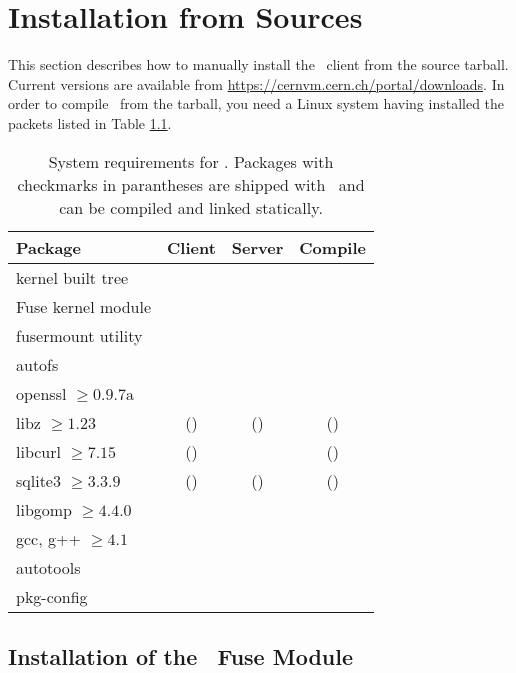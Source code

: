 \chapter{Installation from Sources}
\label{sct:install}
This section describes how to manually install the \cvmfs\ client from the source tarball.
Current versions are available from \url{https://cernvm.cern.ch/portal/downloads}.
In order to compile \cvmfs\ from the tarball, you need a Linux system having installed the packets listed in Table \ref{tab:requirements}.
\begin{table}
	\begin{center}
		\begin{tabular}{l|ccc}
			\centering\bf Package & \bf Client & \bf Server & \bf Compile \\\hline
			kernel built tree & & & \checkmark \\
			Fuse kernel module & \checkmark & & \checkmark\\
			fusermount utility & \checkmark & & \\
			autofs & \checkmark & & \\
			openssl $\geq 0.9.7\text{a}$ & \checkmark & \checkmark & \checkmark\\
			libz $\geq 1.23$ & (\checkmark) & (\checkmark) & (\checkmark)\\
			libcurl $\geq 7.15$ & (\checkmark) & & (\checkmark)\\
			sqlite3 $\geq 3.3.9$ & (\checkmark) & (\checkmark) & (\checkmark)\\
			libgomp $\geq 4.4.0$ & & \checkmark & \checkmark \\
			gcc, g++ $\geq 4.1$ &  & & \checkmark\\
			autotools & & & \checkmark\\
			pkg-config & & & \checkmark\\
		\end{tabular}
	\end{center}
	\caption{System requirements for \cvmfs. Packages with checkmarks in parantheses are shipped with \cvmfs\ and can be compiled and linked statically.}
	\label{tab:requirements}
\end{table}

\section{Installation of the \cvmfs\ Fuse Module}

